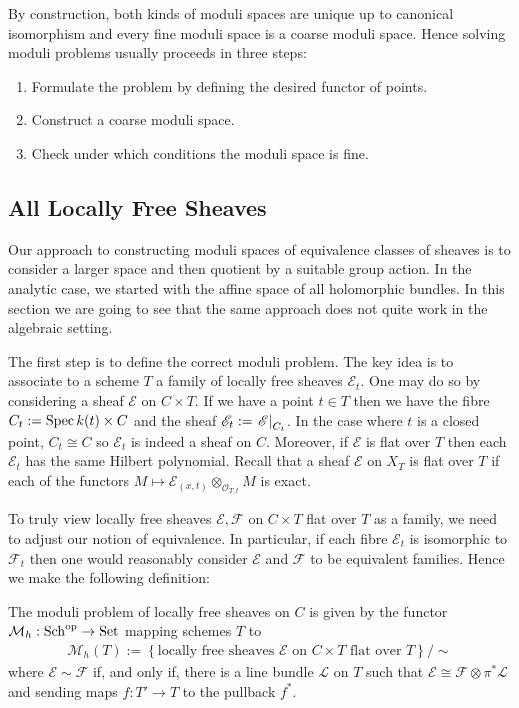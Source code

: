 \documentclass[12pt]{ociamthesis}  %
\begin{document}
By construction, both kinds of moduli spaces are unique up to
canonical isomorphism and every fine moduli space is a coarse moduli
space. Hence solving moduli problems usually proceeds in
three steps:

\begin{enumerate}
  \item Formulate the problem by defining the desired functor of
        points.
  \item Construct a coarse moduli space.
  \item Check under which conditions the moduli space is fine.
\end{enumerate}
\subsection{All Locally Free Sheaves}

Our approach to constructing moduli spaces of equivalence classes of
sheaves is to consider a larger space and then quotient by a suitable
group action. In the analytic case, we started with the affine space of
all holomorphic bundles. In this section we are going to see that
the same approach does not quite work in the algebraic setting.

The first step is to define the correct moduli problem. The key idea
is to associate to a scheme $T$ a family of locally free sheaves
$\mathscr E_t$. One may do so by considering a sheaf $\mathscr E$ on
$C\times T$. If we have a point $t\in T$
then we have the fibre $C_t := \operatorname{Spec} k(t) \times C$ and the sheaf
$\mathscr E_t := \left.{\mathscr E}\right\vert_{C_t}$. In the case where
$t$ is a closed point, $C_t \cong C$ so $\mathscr E_t$ is indeed
a sheaf on $C$. Moreover, if $\mathscr E$ is flat over $T$ then
each $\mathscr E_t$ has the same Hilbert polynomial. Recall that a sheaf
$\mathscr E$ on $X_T$ is flat over $T$ if each of the functors
$M \mapsto \mathscr E_{(x,t)} \otimes_{\mathscr O_{T,t}} M$ is exact.

To truly view locally free sheaves $\mathscr E,\mathscr F$ on
$C\times T$ flat over $T$ as a family, we need to adjust our notion of
equivalence. In particular, if each fibre $\mathscr E_t$ is isomorphic
to $\mathscr F_t$ then one would reasonably consider $\mathscr E$
and $\mathscr F$ to be equivalent families. Hence we make the following definition:

\begin{definition}\label{def:lf_moduli_problem}
  The moduli problem of locally free sheaves on $C$ is given by the
  functor $\mathcal M_h : \operatorname{Sch}^{\text{op}} \to \operatorname{Set}$
  mapping schemes $T$ to
  \begin{align*}
    \mathcal M_h(T) := \left\lbrace{\text{locally free sheaves $\mathscr E$ on $C\times T$ flat over $T$}}\right\rbrace/\sim
  \end{align*}
  where $\mathscr E\sim\mathscr F$ if, and only if, there is a line bundle
  $\mathscr L$ on $T$ such that
  $\mathscr E \cong \mathscr F\otimes\pi^* \mathscr L$ and sending
  maps $f: T'\to T$ to the pullback $f^*$.
\end{definition}
\end{document}
